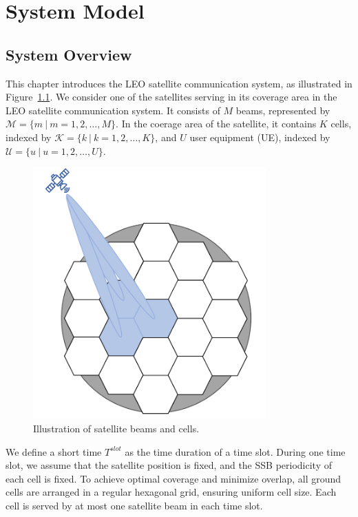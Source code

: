 \chapter{System Model}
\label{chap:model}
\section{System Overview}

This chapter introduces the LEO satellite communication system, as illustrated in Figure~\ref{fig_system}. We consider one of the satellites serving in its coverage area in the LEO satellite communication system. It consists of $M$ beams, represented by $\mathcal{M} = \{m\ |\ m = 1, 2, \ldots, M\}$. In the coerage area of the satellite, it contains $K$ cells, indexed by $\mathcal{K} = \{k\ |\ k = 1, 2, \ldots, K\}$, and $U$ user equipment (UE), indexed by $\mathcal{U} = \{u\ |\ u = 1, 2, \ldots, U\}$. 

\begin{figure}[h!]
    \centering
    \includegraphics[width=0.8\textwidth]{figure/system overview2.pdf}
    \caption{Illustration of satellite beams and cells.}
    \label{fig_system}
\end{figure}
We define a short time $T^{slot}$ as the time duration of a time slot. During one time slot, we assume that the satellite position is fixed, and the SSB periodicity of each cell is fixed. To achieve optimal coverage and minimize overlap, all ground cells are arranged in a regular hexagonal grid, ensuring uniform cell size. Each cell is served by at most one satellite beam in each time slot.


